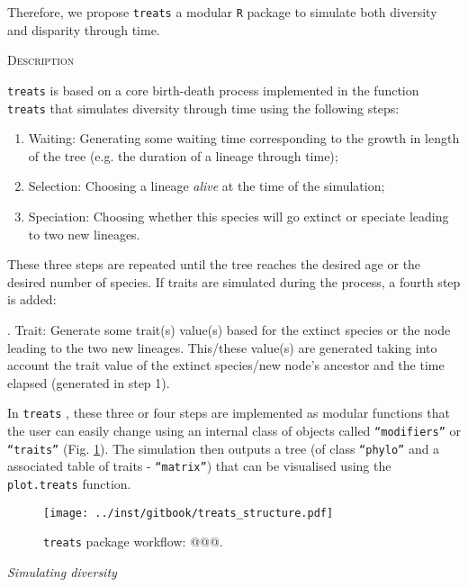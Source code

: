 \documentclass[12pt,letterpaper]{article}
\renewcommand{\section}[1]{%
\bigskip
\begin{center}
\begin{Large}
\normalfont\scshape #1
\medskip
\end{Large}
\end{center}}
\renewcommand{\subsection}[1]{%
\bigskip
\begin{center}
\begin{large}
\normalfont\itshape #1
\end{large}
\end{center}}
\newcommand{\treats}{\texttt{treats} }
\begin{document}
Therefore, we propose \treats a modular \texttt{R} package to simulate both diversity and disparity through time.

\section{Description}
\treats is based on a core birth-death process implemented in the function \texttt{treats} that simulates diversity through time using the following steps:

\begin{enumerate}
    \item Waiting: Generating some waiting time corresponding to the growth in length of the tree (e.g. the duration of a lineage through time);
    \item Selection: Choosing a lineage \textit{alive} at the time of the simulation;
    \item Speciation: Choosing whether this species will go extinct or speciate leading to two new lineages.
\end{enumerate}

These three steps are repeated until the tree reaches the desired age or the desired number of species.
If traits are simulated during the process, a fourth step is added:

. Trait: Generate some trait(s) value(s) based for the extinct species or the node leading to the two new lineages.
This/these value(s) are generated taking into account the trait value of the extinct species/new node's ancestor and the time elapsed (generated in step 1).

In \treats, these three or four steps are implemented as modular functions that the user can easily change using an internal class of objects called \texttt{``modifiers''} or \texttt{``traits''} (Fig. \ref{Fig:workflow}).
The simulation then outputs a tree (of class \texttt{``phylo''} and a associated table of traits - \texttt{``matrix''}) that can be visualised using the \texttt{plot.treats} function.

\begin{figure}[!htbp]
\centering
   \texttt{[image: ../inst/gitbook/treats\_structure.pdf]} 
\caption{\treats package workflow: @@@.}
\label{Fig:workflow}
\end{figure}

\subsection{Simulating diversity}
\end{document}
